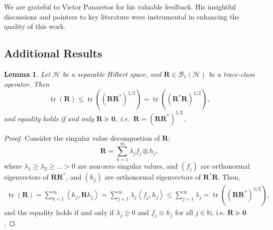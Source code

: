 \documentclass[noinfoline]{imsart}\setcounter{tocdepth}{2}
\renewcommand{\b}[1]{\mathbb{#1}} %
\newcommand{\m}[1]{\mathbf{#1}} %
\renewcommand{\c}[1]{\mathcal{#1}} %
\newcommand{\innpr}[2]{{\left\langle {#1},{#2}\right\rangle}} %
\DeclareMathOperator*{\tr}{tr}
\theoremstyle{plain}
\newtheorem{lemma}[theorem]{Lemma}
\begin{document}
\begin{acks}[Acknowledgments]
We are grateful to Victor Panaretos for his valuable feedback. His insightful discussions and pointers to key literature were instrumental in enhancing the quality of this work.
\end{acks}


  

\newpage

\begin{appendix}

\section{Additional Results}
\begin{lemma}\label{lem:Neumann:eq}
Let $\c{H}$ be a separable Hilbert space, and $\m{R} \in \c{B}_{1}(\c{H})$ be a trace-class operator. Then 
\begin{equation*}
    \tr(\m{R}) \le \tr((\m{R}\m{R}^{*})^{1/2}) = \tr((\m{R}^{*}\m{R})^{1/2}),
\end{equation*}
and equality holds if and only $\m{R} \succeq \m{0}$, i.e.\ $\m R=(\m R\m R^*)^{1/2}$.
\end{lemma}
\begin{proof}
Consider the singular value decompostion of $\m{R}$:
\begin{equation*}
    \m{R} = \sum_{k=1}^{\infty} \lambda_{j} f_{j} \otimes h_{j},
\end{equation*}
where $\lambda_{1} \ge \lambda_{2} \ge \dots > 0$ are non-zero singular values, and $(f_{j})$ are orthonormal eigenvectors of $\m{R}\m{R}^{*}$, and $(h_{j})$ are orthonormal eigenvectors of $\m{R}^{*} \m{R}$. Then,
\begin{align*}
    \tr(\m{R}) = \sum_{k=1}^{\infty} \innpr{h_{j}}{\m{R} h_{j}} = \sum_{j=1}^{\infty} \lambda_{j} \innpr{f_{j}}{h_{j}} \le \sum_{j=1}^{\infty} \lambda_{j} = \tr((\m{R}\m{R}^{*})^{1/2}),
\end{align*}
and the equality holds if and only if $\lambda_{j} \ge 0$ and $f_{j} \equiv h_{j}$ for all $j \in \b{N}$, i.e. $\m{R} \succeq \m{0}$
\cite{hsing2015theoretical}.
\end{proof}


\end{appendix}
\end{document}
